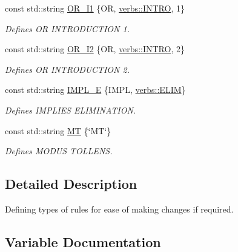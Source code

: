 \begin{DoxyCompactItemize}
const std\+::string \mbox{\hyperlink{namespacerule__literals_a0c61940a6e12e4ea3a41346b5b3c5870}{O\+R\+\_\+\+I1}} \{OR, \mbox{\hyperlink{namespaceverbs_a160cd2b49b96eb11b6db907bf94b5c3a}{verbs\+::\+I\+N\+T\+RO}}, \textquotesingle{}1\textquotesingle{}\}
\begin{DoxyCompactList}\small\item\em Defines OR I\+N\+T\+R\+O\+D\+U\+C\+T\+I\+ON 1. \end{DoxyCompactList}\item 
const std\+::string \mbox{\hyperlink{namespacerule__literals_a2c1ef10ddec67801c44ea5b3e15ed133}{O\+R\+\_\+\+I2}} \{OR, \mbox{\hyperlink{namespaceverbs_a160cd2b49b96eb11b6db907bf94b5c3a}{verbs\+::\+I\+N\+T\+RO}}, \textquotesingle{}2\textquotesingle{}\}
\begin{DoxyCompactList}\small\item\em Defines OR I\+N\+T\+R\+O\+D\+U\+C\+T\+I\+ON 2. \end{DoxyCompactList}\item 
const std\+::string \mbox{\hyperlink{namespacerule__literals_a51a002ead2192c49b9c6216c5fbe3b74}{I\+M\+P\+L\+\_\+E}} \{I\+M\+PL, \mbox{\hyperlink{namespaceverbs_ae28355cc9321ebee9abcd23bb6e1b836}{verbs\+::\+E\+L\+IM}}\}
\begin{DoxyCompactList}\small\item\em Defines I\+M\+P\+L\+I\+ES E\+L\+I\+M\+I\+N\+A\+T\+I\+ON. \end{DoxyCompactList}\item 
const std\+::string \mbox{\hyperlink{namespacerule__literals_a056c3d0c0b701c07f444b7c5adfa8ff4}{MT}} \{\char`\"{}MT\char`\"{}\}
\begin{DoxyCompactList}\small\item\em Defines M\+O\+D\+US T\+O\+L\+L\+E\+NS. \end{DoxyCompactList}\end{DoxyCompactItemize}


\subsection{Detailed Description}
Defining types of rules for ease of making changes if required. 

\subsection{Variable Documentation}
\mbox{\label{namespacerule__literals_a28f9829b438b28638be8c82c450237e1}} 
